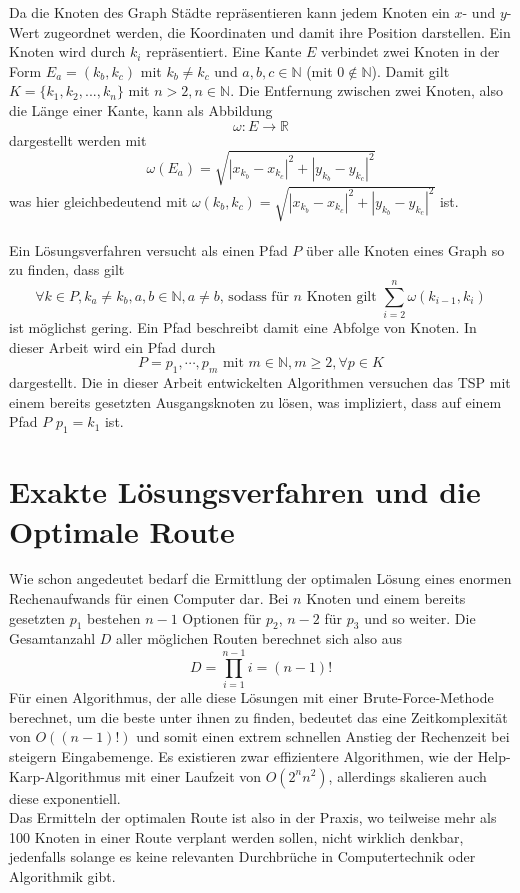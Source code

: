 Da die Knoten des Graph Städte repräsentieren kann jedem Knoten ein $x$- und $y$- Wert zugeordnet werden, die Koordinaten und damit ihre Position darstellen.
Ein Knoten wird durch $k_i$ repräsentiert.
Eine Kante $E$ verbindet zwei Knoten in der Form $E_a = (k_b,k_c)$ mit $k_b \neq k_c$ und $a,b,c \in \mathbb{N}$ (mit $0 \not \in \mathbb{N}$).
Damit gilt $K=\{k_1,k_2,...,k_n\}$ mit $n > 2, n \in \mathbb{N}$.
Die Entfernung zwischen zwei Knoten, also die Länge einer Kante, kann als Abbildung $$\omega : E \rightarrow \mathbb{R}$$ 
dargestellt werden mit 
$$\omega(E_a) = \sqrt{|x_{k_b} - x_{k_c}|^2 + |y_{k_b} - y_{k_c}|^2}$$
was hier gleichbedeutend mit $\omega(k_b,k_c) = \sqrt{|x_{k_b} - x_{k_c}|^2 + |y_{k_b} - y_{k_c}|^2}$ ist.
\\\\
Ein Lösungsverfahren versucht als einen Pfad $P$ über alle Knoten eines Graph so zu finden, dass gilt
$$\forall k \in P,k_a \neq k_b, a,b\in \mathbb{N},a\neq b \textrm{, sodass für $n$ Knoten gilt } \sum_{i=2}^n \omega(k_{i-1},k_i)$$
ist möglichst gering.
Ein Pfad beschreibt damit eine Abfolge von Knoten. In dieser Arbeit wird ein Pfad durch
$$P=p_1,\cdots,p_m \textrm{ mit } m\in\mathbb{N},m \geq 2, \forall p \in K$$
dargestellt.
Die in dieser Arbeit entwickelten Algorithmen versuchen das \ac{TSP} mit einem bereits gesetzten Ausgangsknoten zu lösen, was impliziert, dass auf einem Pfad $P$ $p_1 = k_1$ ist.
\section{Exakte Lösungsverfahren und die Optimale Route}
Wie schon angedeutet bedarf die Ermittlung der optimalen Lösung eines enormen Rechenaufwands für einen Computer dar.
Bei $n$ Knoten und einem bereits gesetzten $p_1$ bestehen $n-1$ Optionen für $p_2$, $n-2$ für $p_3$ und so weiter.
Die Gesamtanzahl $D$ aller möglichen Routen berechnet sich also aus
$$D = \prod_{i=1}^{n-1} i = (n-1)!$$
Für einen Algorithmus, der alle diese Lösungen mit einer Brute-Force-Methode berechnet, um die beste unter ihnen zu finden, bedeutet das eine Zeitkomplexität von $O((n-1)!)$ und somit einen extrem schnellen Anstieg der Rechenzeit bei steigern Eingabemenge.\autocite[18]{Gurski.2010}
Es existieren zwar effizientere Algorithmen, wie der Help-Karp-Algorithmus\autocite[14]{Hutchinson.2016} mit einer Laufzeit von $O(2^nn^2)$, allerdings skalieren auch diese exponentiell.
\\
Das Ermitteln der optimalen Route ist also in der Praxis, wo teilweise mehr als 100 Knoten in einer Route verplant werden sollen, nicht wirklich denkbar, jedenfalls solange es keine relevanten Durchbrüche in Computertechnik oder Algorithmik gibt.

